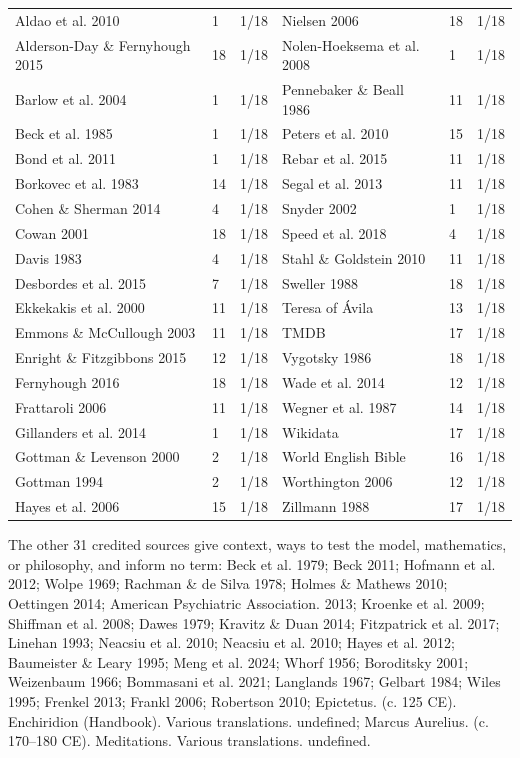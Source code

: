 \documentclass[10pt]{article}
\theoremstyle{remark}
\begin{document}
{\begin{center}
\begin{tabular}{@{}lll|lll@{}}
Aldao et al. 2010 & 1 & 1/18 & Nielsen 2006 & 18 & 1/18\\
Alderson-Day \& Fernyhough 2015 & 18 & 1/18 & Nolen-Hoeksema et al. 2008 & 1 & 1/18\\
Barlow et al. 2004 & 1 & 1/18 & Pennebaker \& Beall 1986 & 11 & 1/18\\
Beck et al. 1985 & 1 & 1/18 & Peters et al. 2010 & 15 & 1/18\\
Bond et al. 2011 & 1 & 1/18 & Rebar et al. 2015 & 11 & 1/18\\
Borkovec et al. 1983 & 14 & 1/18 & Segal et al. 2013 & 11 & 1/18\\
Cohen \& Sherman 2014 & 4 & 1/18 & Snyder 2002 & 1 & 1/18\\
Cowan 2001 & 18 & 1/18 & Speed et al. 2018 & 4 & 1/18\\
Davis 1983 & 4 & 1/18 & Stahl \& Goldstein 2010 & 11 & 1/18\\
Desbordes et al. 2015 & 7 & 1/18 & Sweller 1988 & 18 & 1/18\\
Ekkekakis et al. 2000 & 11 & 1/18 & Teresa of \'Avila & 13 & 1/18\\
Emmons \& McCullough 2003 & 11 & 1/18 & TMDB & 17 & 1/18\\
Enright \& Fitzgibbons 2015 & 12 & 1/18 & Vygotsky 1986 & 18 & 1/18\\
Fernyhough 2016 & 18 & 1/18 & Wade et al. 2014 & 12 & 1/18\\
Frattaroli 2006 & 11 & 1/18 & Wegner et al. 1987 & 14 & 1/18\\
Gillanders et al. 2014 & 1 & 1/18 & Wikidata & 17 & 1/18\\
Gottman \& Levenson 2000 & 2 & 1/18 & World English Bible & 16 & 1/18\\
Gottman 1994 & 2 & 1/18 & Worthington 2006 & 12 & 1/18\\
Hayes et al. 2006 & 15 & 1/18 & Zillmann 1988 & 17 & 1/18\\
\hline
\end{tabular}
\end{center}}
The other 31 credited sources give context, ways to test the model, mathematics, or philosophy, and inform no term: Beck et al. 1979; Beck 2011; Hofmann et al. 2012; Wolpe 1969; Rachman \& de Silva 1978; Holmes \& Mathews 2010; Oettingen 2014; American Psychiatric Association. 2013; Kroenke et al. 2009; Shiffman et al. 2008; Dawes 1979; Kravitz \& Duan 2014; Fitzpatrick et al. 2017; Linehan 1993; Neacsiu et al. 2010; Neacsiu et al. 2010; Hayes et al. 2012; Baumeister \& Leary 1995; Meng et al. 2024; Whorf 1956; Boroditsky 2001; Weizenbaum 1966; Bommasani et al. 2021; Langlands 1967; Gelbart 1984; Wiles 1995; Frenkel 2013; Frankl 2006; Robertson 2010; Epictetus. (c. 125 CE). Enchiridion (Handbook). Various translations. undefined; Marcus Aurelius. (c. 170--180 CE). Meditations. Various translations. undefined.
\end{document}
